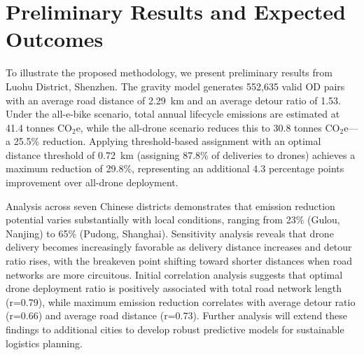 \documentclass[11pt]{article}
\begin{document}
\section{Preliminary Results and Expected Outcomes}

To illustrate the proposed methodology, we present preliminary results from Luohu District, Shenzhen. The gravity model generates 552,635 valid OD pairs with an average road distance of 2.29~km and an average detour ratio of 1.53. Under the all-e-bike scenario, total annual lifecycle emissions are estimated at 41.4 tonnes CO$_2$e, while the all-drone scenario reduces this to 30.8 tonnes CO$_2$e---a 25.5\% reduction. Applying threshold-based assignment with an optimal distance threshold of 0.72~km (assigning 87.8\% of deliveries to drones) achieves a maximum reduction of 29.8\%, representing an additional 4.3 percentage points improvement over all-drone deployment.

Analysis across seven Chinese districts demonstrates that emission reduction potential varies substantially with local conditions, ranging from 23\% (Gulou, Nanjing) to 65\% (Pudong, Shanghai). Sensitivity analysis reveals that drone delivery becomes increasingly favorable as delivery distance increases and detour ratio rises, with the breakeven point shifting toward shorter distances when road networks are more circuitous. Initial correlation analysis suggests that optimal drone deployment ratio is positively associated with total road network length (r=0.79), while maximum emission reduction correlates with average detour ratio (r=0.66) and average road distance (r=0.73). Further analysis will extend these findings to additional cities to develop robust predictive models for sustainable logistics planning.




\end{document}
